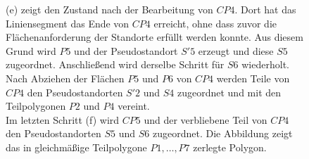 \documentclass[ngerman]{seminarbeitrag}
\begin{document}
\begin{figure}[hb]
{ (e) zeigt den Zustand nach der Bearbeitung von $CP4$. Dort hat das Liniensegment das Ende von $CP4$ erreicht, ohne dass zuvor die Flächenanforderung der Standorte erfüllt werden konnte. Aus diesem Grund wird $P5$ und der Pseudostandort $S'5$ erzeugt und diese $S5$ zugeordnet. Anschließend wird derselbe Schritt für $S6$ wiederholt. Nach Abziehen der Flächen $P5$ und $P6$ von $CP4$ werden Teile von $CP4$ den Pseudostandorten $S'2$ und $S4$ zugeordnet und mit den Teilpolygonen $P2$ und $P4$ vereint.\\
Im letzten Schritt (f) wird $CP5$ und der verbliebene Teil von $CP4$ den Pseudostandorten $S5$ und $S6$ zugeordnet. Die Abbildung zeigt das in gleichmäßige Teilpolygone $P1,…,P7$ zerlegte Polygon.}
\label{beispiel nicht konvex}
\end{figure}


\end{document}

